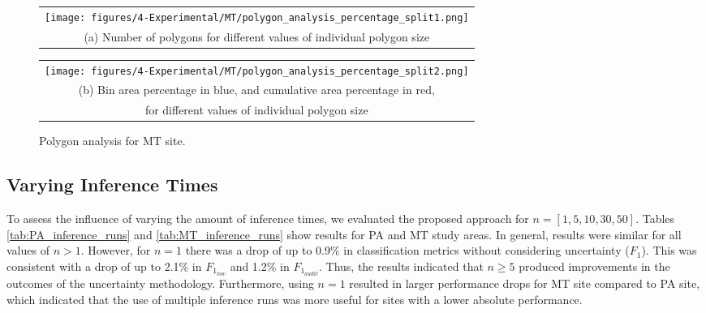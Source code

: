 \begin{figure*}
  \centering
  \begin{tabular}{@{}c@{}}
    \texttt{[image: figures/4-Experimental/MT/polygon\_analysis\_percentage\_split1.png]} \\[\abovecaptionskip]
    \small (a) Number of polygons for different values of individual polygon size
  \end{tabular}

  \vspace{\floatsep}

  \begin{tabular}{@{}c@{}}
    \hspace*{20pt}\texttt{[image: figures/4-Experimental/MT/polygon\_analysis\_percentage\_split2.png]} \\[\abovecaptionskip]
    \small (b) Bin area percentage in blue, and cumulative area percentage in red, \\ for different values of individual polygon size
  \end{tabular}

  \caption{Polygon analysis for MT site.}\label{fig:MT_polygon_analysis}
\end{figure*}

\iffalse
\subsection{Varying Inference Times}\label{sec:results_inference_times}

To assess the influence of varying the amount of inference times, we evaluated the proposed approach for $n=[1, 5, 10, 30, 50]$. Tables \ref{tab:PA_inference_runs} and \ref{tab:MT_inference_runs} show results for PA and MT study areas. In general, results were similar for all values of $n>1$. However, for $n=1$ there was a drop of up to 0.9\% in classification metrics without considering uncertainty ($F_1$). This was consistent with a drop of up to  2.1\% in $F_{1_{low}}$ and 1.2\% in $F_{1_{audit}}$. Thus, the results indicated that $n\geq 5$ produced improvements in the outcomes of the uncertainty methodology. Furthermore, using $n=1$ resulted in larger performance drops for MT site compared to PA site, which indicated that the use of multiple inference runs was more useful for sites with a lower absolute performance.

